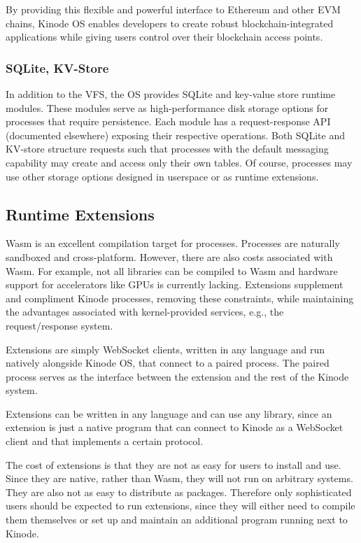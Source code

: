 \documentclass[runningheads]{llncs}
\begin{document}
By providing this flexible and powerful interface to Ethereum and other EVM chains, Kinode OS enables developers to create robust blockchain-integrated applications while giving users control over their blockchain access points.

\subsubsection{SQLite, KV-Store}
\label{sec:osdbs}

In addition to the VFS, the OS provides SQLite and key-value store runtime modules.
These modules serve as high-performance disk storage options for processes that require persistence.
Each module has a request-response API (documented elsewhere) exposing their respective operations.
Both SQLite and KV-store structure requests such that processes with the default messaging capability may create and access only their own tables.
Of course, processes may use other storage options designed in userspace or as runtime extensions.

\subsection{Runtime Extensions}
\label{sec:osextensions}

Wasm is an excellent compilation target for processes.
Processes are naturally sandboxed and cross-platform.
However, there are also costs associated with Wasm.
For example, not all libraries can be compiled to Wasm and hardware support for accelerators like GPUs is currently lacking.
Extensions supplement and compliment Kinode processes, removing these constraints, while maintaining the advantages associated with kernel-provided services, e.g., the request/response system.

Extensions are simply WebSocket clients, written in any language and run natively alongside Kinode OS, that connect to a paired process.
The paired process serves as the interface between the extension and the rest of the Kinode system.

Extensions can be written in any language and can use any library, since an extension is just a native program that can connect to Kinode as a WebSocket client and that implements a certain protocol.

The cost of extensions is that they are not as easy for users to install and use.
Since they are native, rather than Wasm, they will not run on arbitrary systems.
They are also not as easy to distribute as packages.
Therefore only sophisticated users should be expected to run extensions, since they will either need to compile them themselves or set up and maintain an additional program running next to Kinode.
\end{document}

